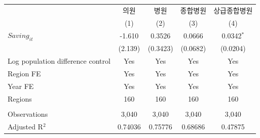 \begingroup
\centering
\begin{tabular}{lcccc}
   \toprule
                                     & 의원    & 병원     & 종합병원 & 상급종합병원 \\   
                                     & (1)     & (2)      & (3)      & (4)\\  
   \midrule 
   $Saving_{it}$                     & -1.610  & 0.3526   & 0.0666   & 0.0342$^{*}$\\   
                                     & (2.139) & (0.3423) & (0.0682) & (0.0204)\\   
   Log population difference control & Yes     & Yes      & Yes      & Yes\\  
   Region FE                         & Yes     & Yes      & Yes      & Yes\\  
   Year FE                           & Yes     & Yes      & Yes      & Yes\\  
   Regions                           & 160     & 160      & 160      & 160\\  
    \\
   Observations                      & 3,040   & 3,040    & 3,040    & 3,040\\  
   Adjusted R$^2$                    & 0.74036 & 0.75776  & 0.68686  & 0.47875\\  
   \bottomrule
\end{tabular}
\par\endgroup
